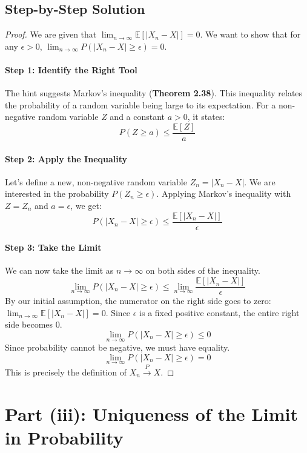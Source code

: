 \documentclass[11pt,a4paper]{article}
\theoremstyle{exercise}
\begin{document}
\subsection*{Step-by-Step Solution}
\begin{proof}
We are given that $\lim_{n \to \infty} \mathbb{E}[|X_n - X|] = 0$. We want to show that for any $\epsilon > 0$, $\lim_{n \to \infty} P(|X_n - X| \ge \epsilon) = 0$.

\paragraph{Step 1: Identify the Right Tool}
The hint suggests Markov's inequality (\textbf{Theorem 2.38}). This inequality relates the probability of a random variable being large to its expectation. For a non-negative random variable $Z$ and a constant $a > 0$, it states:
\[
P(Z \ge a) \le \frac{\mathbb{E}[Z]}{a}
\]

\paragraph{Step 2: Apply the Inequality}
Let's define a new, non-negative random variable $Z_n = |X_n - X|$. We are interested in the probability $P(Z_n \ge \epsilon)$. Applying Markov's inequality with $Z = Z_n$ and $a = \epsilon$, we get:
\[
P(|X_n - X| \ge \epsilon) \le \frac{\mathbb{E}[|X_n - X|]}{\epsilon}
\]

\paragraph{Step 3: Take the Limit}
We can now take the limit as $n \to \infty$ on both sides of the inequality.
\[
\lim_{n \to \infty} P(|X_n - X| \ge \epsilon) \le \lim_{n \to \infty} \frac{\mathbb{E}[|X_n - X|]}{\epsilon}
\]
By our initial assumption, the numerator on the right side goes to zero: $\lim_{n \to \infty} \mathbb{E}[|X_n - X|] = 0$. Since $\epsilon$ is a fixed positive constant, the entire right side becomes 0.
\[
\lim_{n \to \infty} P(|X_n - X| \ge \epsilon) \le 0
\]
Since probability cannot be negative, we must have equality.
\[
\lim_{n \to \infty} P(|X_n - X| \ge \epsilon) = 0
\]
This is precisely the definition of $X_n \xrightarrow{P} X$.
\end{proof}

\section*{Part (iii): Uniqueness of the Limit in Probability}
\end{document}

